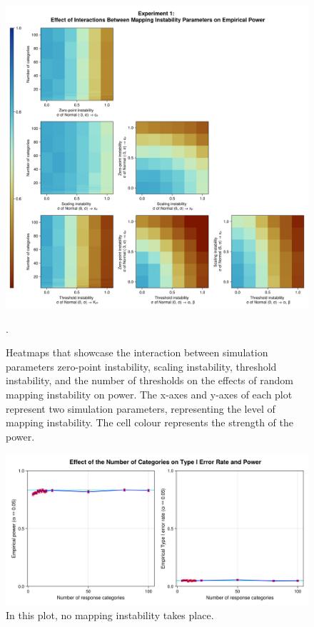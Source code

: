 \documentclass[titlepage, a4paper, 11pt]{article}
\begin{document}
\begin{figure}
    \centering
    \includegraphics[width=1\linewidth]{Plots/Interactions_measurement_instability_power.png}
    \caption{Heatmaps that showcase the interaction between simulation parameters zero-point instability, scaling instability, threshold instability, and the number of thresholds on the effects of random mapping instability on power. The x-axes and y-axes of each plot represent two simulation parameters, representing the level of mapping instability. The cell colour represents the strength of the power.}.
    \label{fig:plot_two}
\end{figure}

\begin{figure}
    \centering
    \includegraphics[width=0.75\linewidth]{Plots/nCategories_and_power_typeI.png}
    \caption{In this plot, no mapping instability takes place. }
    \label{fig:plot_three}
\end{figure}
\end{document}
